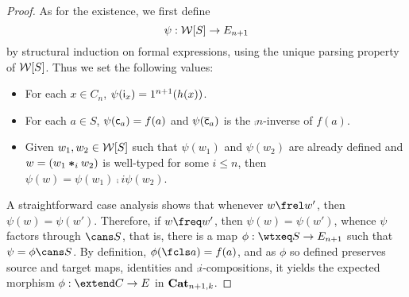 \begin{proof}
  As for the existence, we first define
  \[\psi:\mathcal{W}[S]\to E_{n+1}\]
  by structural induction on formal expressions, using the unique
  parsing property of
  $\mathcal{W}[S]$. Thus we set the
  following values:
  \begin{itemize}
  \item For each $x\in C_n$, $\psi(\mathsf{i}_{x})=1^{n+1}(h(x))$.
  \item For each $a\in S$, $\psi(\mathsf{c}_{a})=f(a)$ and $\psi(\overline{\mathsf{c}}_{a})$ is
    the $\comp n$-inverse of $f(a)$.
  \item Given $w_1,w_2\in \mathcal{W}[S]$ such that $\psi(w_1)$ and
    $\psi(w_2)$ are already defined and $w=(w_1\bm{\ast}_{i} w_2)$ is
    well-typed for some $i\leq n$, then $\psi(w)=\psi(w_1)\comp
    i\psi(w_2)$.
  \end{itemize}
  A straightforward case analysis shows that whenever $w\frel w'$,
  then $\psi(w)=\psi(w')$. Therefore, if $w\freq w'$, then
  $\psi(w)=\psi(w')$, whence $\psi$ factors through $\cans S$, that
  is, there is a map $\phi:\wtxeq S\to E_{n+1}$ such that
  $\psi=\phi\cans S$. By definition, $\phi(\fcls a)=f(a)$, and as $\phi$ so defined preserves source and target
  maps, identities and $\comp i$-compositions, it yields the expected morphism
  $\phi:\extend C\to E$ in $\mathbf{Cat}_{n+1,k}$.
\end{proof}
  
 

 
 








 
 
 
